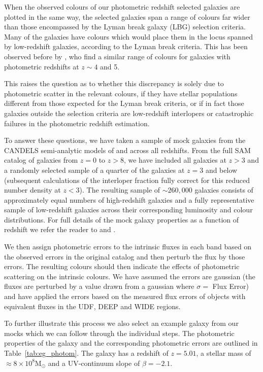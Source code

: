 When the observed colours of our photometric redshift selected galaxies are plotted in the same way, the selected galaxies span a range of colours far wider than those encompassed by the Lyman break galaxy (LBG) selection criteria. Many of the galaxies have colours which would place them in the locus spanned by low-redshift galaxies, according to the Lyman break criteria. This has been observed before by \citet{2010ApJ...724..425D}, who find a similar range of colours for galaxies with photometric redshifts at $z \sim 4$ and 5.

This raises the question as to whether this discrepancy is solely due to photometric scatter in the relevant colours, if they have stellar populations different from those expected for the Lyman break criteria, or if in fact those galaxies outside the selection criteria are low-redshift interlopers or catastrophic failures in the photometric redshift estimation.

To answer these questions, we have taken a sample of mock galaxies from the CANDELS semi-analytic models of \citet{Somerville:2008ed} and \citet{Somerville:2012cq} across all redshifts. From the full SAM catalog of galaxies from $z = 0$ to $z > 8$, we have included all galaxies at $z > 3$ and a randomly selected sample of a quarter of the galaxies at $z = 3$ and below (subsequent calculations of the interloper fraction fully correct for this reduced number density at $z < 3$). The resulting sample of $\sim 260,000$ galaxies consists of approximately equal numbers of high-redshift galaxies and a fully representative sample of low-redshift galaxies across their corresponding luminosity and colour distributions. For full details of the mock galaxy properties as a function of redshift we refer the reader to \citet{Somerville:2008ed} and \citet{Lu:2013ui}.

We then assign photometric errors to the intrinsic fluxes in each band based on the observed errors in the original catalog and then perturb the flux by those errors. The resulting colours should then indicate the effects of photometric scattering on the intrinsic colours. We have assumed the errors are gaussian (the fluxes are perturbed by a value drawn from a gaussian where $\sigma =$ Flux Error) and have applied the errors based on the measured flux errors of objects with equivalent fluxes in the UDF, DEEP and WIDE regions. 

To further illustrate this process we also select an example galaxy from our mocks which we can follow through the individual steps. The photometric properties of the galaxy and the corresponding photometric errors are outlined in Table~\ref{tab:eg_photom}. The galaxy has a redshift of $z = 5.01$, a stellar mass of $\approx 8 \times 10^{8} \text{M}_{\odot}$ and a UV-continuum slope of $\beta = -2.1$.

